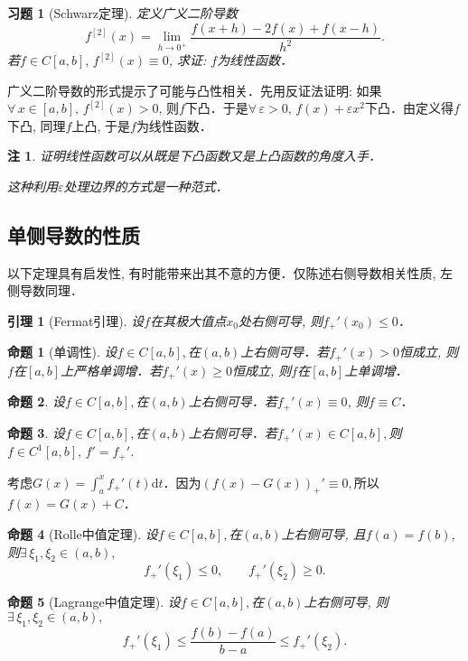 \documentclass[11pt,a4paper]{ctexart}
\makeatletter
\theoremstyle{thmseries} %
\newtheorem{prop}{命题}[section]
\newtheorem{lem}{引理}[section]
\theoremstyle{exerseries}
\newtheorem{exer}{习题}[section]
\newtheorem*{rem}{注}
\renewenvironment{proof}[1][\proofname]{\par
  \pushQED{\qed}%
  \normalfont \topsep6\p@\@plus6\p@\relax
  \trivlist
  \item[\hskip\labelsep
        \itshape
    #1\@addpunct{}]\ignorespaces
}{%
  \popQED\endtrivlist\@endpefalse
}
\newenvironment{pf}{\begin{proof}[\bfseries\upshape 证\quad]}{\end{proof}}
\newcommand{\bra}[1]{\mathopen{}\left(#1\right)}
\renewcommand{\epsilon}{\varepsilon}
\renewcommand{\d}{\mathrm{d}}
\makeatother
\begin{document}
\begin{exer}[Schwarz定理]
	定义广义二阶导数
	\[f^{[2]}(x)=\lim_{h\to0^+}\frac{f(x+h)-2f(x)+f(x-h)}{h^2}.\]
	若$f\in C[a,b],\,f^{[2]}(x)\equiv0$, 求证: $f$为线性函数．
\end{exer}
\begin{pf}
	广义二阶导数的形式提示了可能与凸性相关．先用反证法证明: 如果$\forall\,x\in[a,b],\,f^{[2]}(x)>0$, 则$f$下凸．于是$\forall\,\epsilon>0,\,f(x)+\epsilon x^2$下凸．由定义得$f$下凸, 同理$f$上凸, 于是$f$为线性函数．
\end{pf}
\begin{rem}
	证明线性函数可以从既是下凸函数又是上凸函数的角度入手．
	
	这种利用$\epsilon$处理边界的方式是一种范式．
\end{rem}


\subsection{单侧导数的性质}
以下定理具有启发性, 有时能带来出其不意的方便．仅陈述右侧导数相关性质, 左侧导数同理．
\begin{lem}[Fermat引理]
	设$f$在其极大值点$x_0$处右侧可导, 则$f_+'(x_0)\leq0$．
\end{lem}

\begin{prop}[单调性]
	设$f\in C[a,b],$在$(a,b)$上右侧可导．若$f_+'(x)>0$恒成立, 则$f$在$[a,b]$上严格单调增．若$f_+'(x)\geq0$恒成立, 则$f$在$[a,b]$上单调增．
\end{prop}

\begin{prop}
	设$f\in C[a,b],$在$(a,b)$上右侧可导．若$f_+'(x)\equiv0$, 则$f\equiv C$．
\end{prop}

\begin{prop}
	设$f\in C[a,b],$在$(a,b)$上右侧可导．若$f_+'(x)\in C[a,b],$则$f\in C^1[a,b],\,f'=f_+'$.
\end{prop}
\begin{pf}
	考虑$G(x)=\int_{a}^{x}f_+'(t)\d t$．因为$\bra{f(x)-G(x)}_+'\equiv0,$所以$f(x)=G(x)+C$．
\end{pf}

\begin{prop}[Rolle中值定理]
	设$f\in C[a,b],$在$(a,b)$上右侧可导, 且$f(a)=f(b)$, 则$\exists\,\xi_1,\xi_2\in(a,b),$
	\[f_+'(\xi_1)\leq0,\qquad f_+'(\xi_2)\geq0.\]
\end{prop}

\begin{prop}[Lagrange中值定理]
	设$f\in C[a,b],$在$(a,b)$上右侧可导, 则$\exists\,\xi_1,\xi_2\in(a,b),$
	\[f_+'(\xi_1)\leq\frac{f(b)-f(a)}{b-a}\leq f_+'(\xi_2).\]
\end{prop}
\end{document}
